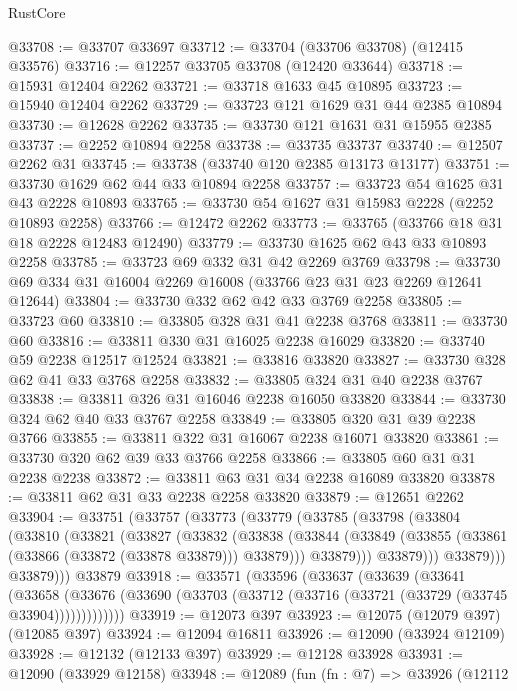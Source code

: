 \begin{lexlean}{RustCore}
\begin{coremodule}
@33708 := @33707 @33697
@33712 := @33704 (@33706 @33708) (@12415 @33576)
@33716 := @12257 @33705 @33708 (@12420 @33644)
@33718 := @15931 @12404 @2262
@33721 := @33718 @1633 @45 @10895
@33723 := @15940 @12404 @2262
@33729 := @33723 @121 @1629 @31 @44 @2385 @10894
@33730 := @12628 @2262
@33735 := @33730 @121 @1631 @31 @15955 @2385
@33737 := @2252 @10894 @2258
@33738 := @33735 @33737
@33740 := @12507 @2262 @31
@33745 := @33738 (@33740 @120 @2385 @13173 @13177)
@33751 := @33730 @1629 @62 @44 @33 @10894 @2258
@33757 := @33723 @54 @1625 @31 @43 @2228 @10893
@33765 := @33730 @54 @1627 @31 @15983 @2228 (@2252 @10893 @2258)
@33766 := @12472 @2262
@33773 := @33765 (@33766 @18 @31 @18 @2228 @12483 @12490)
@33779 := @33730 @1625 @62 @43 @33 @10893 @2258
@33785 := @33723 @69 @332 @31 @42 @2269 @3769
@33798 := @33730 @69 @334 @31 @16004 @2269 @16008 (@33766 @23 @31 @23 @2269 @12641 @12644)
@33804 := @33730 @332 @62 @42 @33 @3769 @2258
@33805 := @33723 @60
@33810 := @33805 @328 @31 @41 @2238 @3768
@33811 := @33730 @60
@33816 := @33811 @330 @31 @16025 @2238 @16029
@33820 := @33740 @59 @2238 @12517 @12524
@33821 := @33816 @33820
@33827 := @33730 @328 @62 @41 @33 @3768 @2258
@33832 := @33805 @324 @31 @40 @2238 @3767
@33838 := @33811 @326 @31 @16046 @2238 @16050 @33820
@33844 := @33730 @324 @62 @40 @33 @3767 @2258
@33849 := @33805 @320 @31 @39 @2238 @3766
@33855 := @33811 @322 @31 @16067 @2238 @16071 @33820
@33861 := @33730 @320 @62 @39 @33 @3766 @2258
@33866 := @33805 @60 @31 @31 @2238 @2238
@33872 := @33811 @63 @31 @34 @2238 @16089 @33820
@33878 := @33811 @62 @31 @33 @2238 @2258 @33820
@33879 := @12651 @2262
@33904 := @33751
    (@33757
      (@33773
        (@33779
          (@33785
            (@33798
              (@33804
                (@33810
                  (@33821
                    (@33827
                      (@33832
                        (@33838
                          (@33844
                            (@33849 (@33855 (@33861 (@33866 (@33872 (@33878 @33879))) @33879)))
                            @33879)))
                      @33879)))
                @33879)))
          @33879)))
    @33879
@33918 := @33571
    (@33596
      (@33637
        (@33639
          (@33641
            (@33658
              (@33676 (@33690 (@33703 (@33712 (@33716 (@33721 (@33729 (@33745 @33904)))))))))))))
@33919 := @12073 @397
@33923 := @12075 (@12079 @397) (@12085 @397)
@33924 := @12094 @16811
@33926 := @12090 (@33924 @12109)
@33928 := @12132 (@12133 @397)
@33929 := @12128 @33928
@33931 := @12090 (@33929 @12158)
@33948 := @12089
    (fun (fn : @7) =>
    @33926
      (@12112

\end{coremodule}
\end{lexlean}
